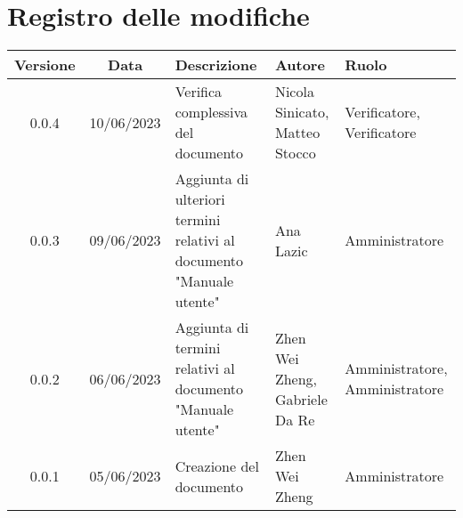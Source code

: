 \section*{Registro delle modifiche}
\begin{center}
\setlength\extrarowheight{5pt}
\renewcommand\tabularxcolumn[1]{>{\Centering}m{#1}}
\begin{tabularx}{\textwidth}{| c | c | X | X | X |} 
\hline
\rowcolor{white}
\textbf{Versione} & \textbf{Data} & \textbf{Descrizione} & \textbf{Autore} & \textbf{Ruolo}\\
 \hline
 0.0.4 & 10/06/2023 & Verifica complessiva del documento & Nicola Sinicato, Matteo Stocco & Verificatore, Verificatore \\
 \hline
 0.0.3 & 09/06/2023 & Aggiunta di ulteriori termini relativi al documento "Manuale utente" & Ana Lazic & Amministratore\\
 \hline
 0.0.2 & 06/06/2023 & Aggiunta di termini relativi al documento "Manuale utente" & Zhen Wei Zheng, Gabriele Da Re & Amministratore, Amministratore\\
 \hline
 0.0.1 & 05/06/2023 & Creazione del documento & Zhen Wei Zheng & Amministratore\\
 \hline
\end{tabularx}
\end{center}
